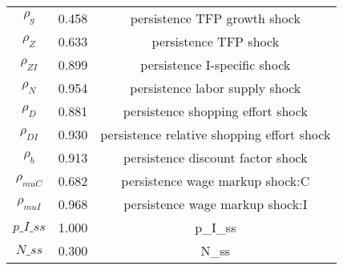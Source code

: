 \begin{center}
\begin{longtable}{ccc}
${\rho_g}$ 	 & 	 0.458 	 & 	 persistence TFP growth shock\\
${\rho_Z}$ 	 & 	 0.633 	 & 	 persistence TFP shock\\
${\rho_{ZI}}$ 	 & 	 0.899 	 & 	 persistence I-specific shock\\
${\rho_N}$ 	 & 	 0.954 	 & 	 persistence labor supply shock\\
${\rho_D}$ 	 & 	 0.881 	 & 	 persistence shopping effort shock\\
${\rho_{DI}}$ 	 & 	 0.930 	 & 	 persistence relative shopping effort shock\\
${\rho_b}$ 	 & 	 0.913 	 & 	 persistence discount factor shock\\
${\rho_{muC}}$ 	 & 	 0.682 	 & 	 persistence wage markup shock:C\\
${\rho_{muI}}$ 	 & 	 0.968 	 & 	 persistence wage markup shock:I\\
$p\_I\_ss$ 	 & 	 1.000 	 & 	 p\_I\_ss\\
$N\_ss$ 	 & 	 0.300 	 & 	 N\_ss\\
\bottomrule%
\end{longtable}
\end{center}
